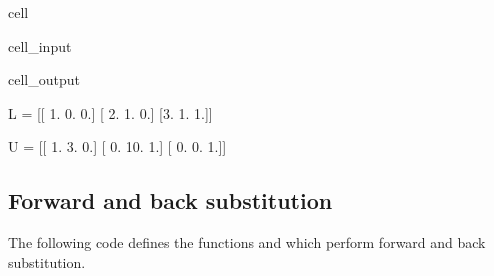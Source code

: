 \documentclass[letterpaper,10pt,english]{jupyterBook}
\begin{document}
\begin{sphinxuseclass}{cell}\begin{sphinxVerbatimInput}

\begin{sphinxuseclass}{cell_input}
\begin{sphinxVerbatim}[commandchars=\\\{\}]
  \PYG{p}{[}\PYG{p}{[}  \PYG{p}{]} \PYG{p}{[}  \PYG{p}{]} \PYG{p}{[}  \PYG{p}{]}\PYG{p}{]}

   

\end{sphinxVerbatim}

\end{sphinxuseclass}\end{sphinxVerbatimInput}
\begin{sphinxVerbatimOutput}

\begin{sphinxuseclass}{cell_output}
\begin{sphinxVerbatim}[commandchars=\\\{\}]
L = 
[[ 1.  0.  0.]
 [ 2.  1.  0.]
 [\PYGZhy{}3. \PYGZhy{}1.  1.]]

U = 
[[  1.   3.   0.]
 [  0. \PYGZhy{}10.  \PYGZhy{}1.]
 [  0.   0.   1.]]
\end{sphinxVerbatim}

\end{sphinxuseclass}\end{sphinxVerbatimOutput}

\end{sphinxuseclass}

\subsection{Forward and back substitution}
\label{\detokenize{8_Appendices/8.1_Python:forward-and-back-substitution}}
\sphinxAtStartPar
The following code defines the functions  and  which perform forward and back substitution.
\end{document}

